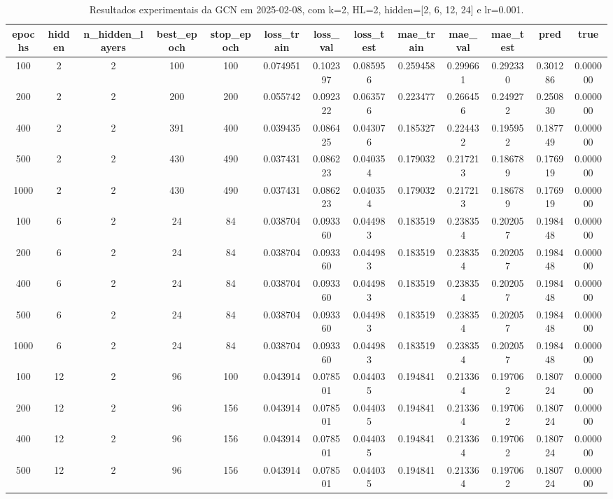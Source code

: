 \begin{table}[h]
\centering
\caption{Resultados experimentais da GCN em 2025-02-08, com k=2, HL=2, hidden=[2, 6, 12, 24] e lr=0.001.}
\label{tab:gcn_results_k2_hl2_d20250208}
\begin{tabular}{ccccccccccccc}
\toprule
epochs & hidden & n\_hidden\_layers & best\_epoch & stop\_epoch & loss\_train & loss\_val & loss\_test & mae\_train & mae\_val & mae\_test & pred & true \\
\midrule
100 & 2 & 2 & 100 & 100 & 0.074951 & 0.102397 & 0.085956 & 0.259458 & 0.299661 & 0.292330 & 0.301286 & 0.000000 \\
200 & 2 & 2 & 200 & 200 & 0.055742 & 0.092322 & 0.063576 & 0.223477 & 0.266456 & 0.249272 & 0.250830 & 0.000000 \\
400 & 2 & 2 & 391 & 400 & 0.039435 & 0.086425 & 0.043076 & 0.185327 & 0.224432 & 0.195952 & 0.187749 & 0.000000 \\
500 & 2 & 2 & 430 & 490 & 0.037431 & 0.086223 & 0.040354 & 0.179032 & 0.217213 & 0.186789 & 0.176919 & 0.000000 \\
1000 & 2 & 2 & 430 & 490 & 0.037431 & 0.086223 & 0.040354 & 0.179032 & 0.217213 & 0.186789 & 0.176919 & 0.000000 \\
100 & 6 & 2 & 24 & 84 & 0.038704 & 0.093360 & 0.044983 & 0.183519 & 0.238354 & 0.202057 & 0.198448 & 0.000000 \\
200 & 6 & 2 & 24 & 84 & 0.038704 & 0.093360 & 0.044983 & 0.183519 & 0.238354 & 0.202057 & 0.198448 & 0.000000 \\
400 & 6 & 2 & 24 & 84 & 0.038704 & 0.093360 & 0.044983 & 0.183519 & 0.238354 & 0.202057 & 0.198448 & 0.000000 \\
500 & 6 & 2 & 24 & 84 & 0.038704 & 0.093360 & 0.044983 & 0.183519 & 0.238354 & 0.202057 & 0.198448 & 0.000000 \\
1000 & 6 & 2 & 24 & 84 & 0.038704 & 0.093360 & 0.044983 & 0.183519 & 0.238354 & 0.202057 & 0.198448 & 0.000000 \\
100 & 12 & 2 & 96 & 100 & 0.043914 & 0.078501 & 0.044035 & 0.194841 & 0.213364 & 0.197062 & 0.180724 & 0.000000 \\
200 & 12 & 2 & 96 & 156 & 0.043914 & 0.078501 & 0.044035 & 0.194841 & 0.213364 & 0.197062 & 0.180724 & 0.000000 \\
400 & 12 & 2 & 96 & 156 & 0.043914 & 0.078501 & 0.044035 & 0.194841 & 0.213364 & 0.197062 & 0.180724 & 0.000000 \\
500 & 12 & 2 & 96 & 156 & 0.043914 & 0.078501 & 0.044035 & 0.194841 & 0.213364 & 0.197062 & 0.180724 & 0.000000 \\

\end{tabular}
\end{table}
